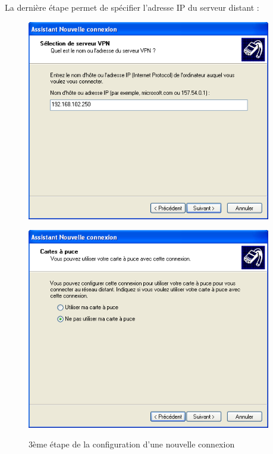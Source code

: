 La dernière étape permet de spécifier l'adresse IP du serveur distant : %

\begin{figure}[H]
	\begin{minipage}{0.5\textwidth}
		\begin{flushleft} \large
			\includegraphics[width=0.95\textwidth]{partie_2/screen_windows/etape5.PNG}\\
		\end{flushleft}
	\end{minipage}
	\begin{minipage}{0.49\textwidth}
		\begin{flushright} \large
			\includegraphics[width=0.95\textwidth]{partie_2/screen_windows/etape6.PNG}\\
		\end{flushright}
	\end{minipage}
	\caption{3ème étape de la configuration d'une nouvelle connexion}
	\label{VPN_ETAPE3}
\end{figure}

